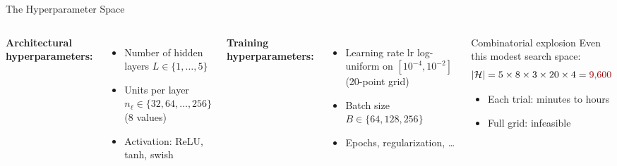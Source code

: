 \documentclass[aspectratio=169,11pt]{beamer}
\newcommand{\emphc}[1]{\textcolor{harvardcrimson}{#1}}
\begin{document}
\begin{frame}{The Hyperparameter Space}
\begin{columns}[T]
\textbf{Architectural hyperparameters:}
\begin{itemize}
    \item Number of hidden layers $L \in \{1, \ldots, 5\}$
    \item Units per layer $n_\ell \in \{32, 64, \ldots, 256\}$ (8 values)
    \item Activation: ReLU, tanh, swish
\end{itemize}

\vspace{0.3cm}
\textbf{Training hyperparameters:}
\begin{itemize}
    \item Learning rate $\mathrm{lr}$ log-uniform on $[10^{-4}, 10^{-2}]$ (20-point grid)
    \item Batch size $B \in \{64, 128, 256\}$
    \item Epochs, regularization, \ldots
\end{itemize}

\begin{block}{Combinatorial explosion}
Even this modest search space:
\[
    |\mathcal{H}| = 5 \times 8 \times 3 \times 20 \times 4 = \emphc{9{,}600}
\]
\vspace{-0.2cm}
\begin{itemize}
    \item Each trial: minutes to hours
    \item Full grid: \emphc{infeasible}
\end{itemize}
\end{block}
\end{columns}
\end{frame}
\end{document}
